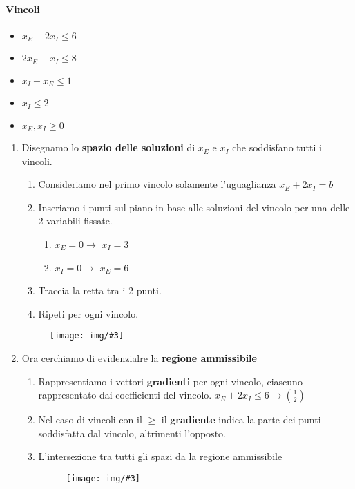 \documentclass[12pt, twoside, letterpaper]{article}
\newcommand{\img}[3] {
	\begin{figure}[h]
		\caption*{#1}
		\centering
		\texttt{[image: img/\#3]}\\
	\end{figure}
}
\begin{document}
			\paragraph{Vincoli}
				\begin{itemize}
					\item $x_E + 2x_I \leq 6$
					\item $2x_E + x_I \leq 8$
					\item $x_I - x_E \leq 1$
					\item $x_I \leq 2$
					\item $x_E, x_I \geq 0 $
				\end{itemize} 
			\begin{enumerate}
				\item Disegnamo lo \textbf{spazio delle soluzioni} di $x_E$ e $x_I$ che soddisfano tutti i vincoli.
				\begin{enumerate}
					\item Consideriamo nel primo vincolo solamente l'uguaglianza $x_E + 2x_I = b$
					\item Inseriamo i punti sul piano in base alle soluzioni del vincolo per una delle 2 variabili fissate. 
					\begin{enumerate}
						\item $x_E = 0 \rightarrow$ $x_I = 3$	
						\item $x_I = 0 \rightarrow$ $x_E = 6$			
					\end{enumerate}	
					\item Traccia la retta tra i 2 punti.
					\item Ripeti per ogni vincolo.
				\end{enumerate}
				\img{}{0.2}{img1.jpg}
				
				\item Ora cerchiamo di evidenzialre la \textbf{regione ammissibile}
					\begin{enumerate}
						\item Rappresentiamo i vettori \textbf{gradienti} per ogni vincolo, ciascuno rappresentato dai coefficienti del vincolo. $x_E + 2x_I \leq 6 \rightarrow \binom{1}{2}$
						\item Nel caso di vincoli con il $\geq$ il \textbf{gradiente} indica la parte dei punti soddisfatta dal vincolo, altrimenti l'opposto.
						\item L'intersezione tra tutti gli spazi da la regione ammissibile
						\img{}{0.2}{img2.jpg}
					\end{enumerate}
					

\end{enumerate}
\end{document}
